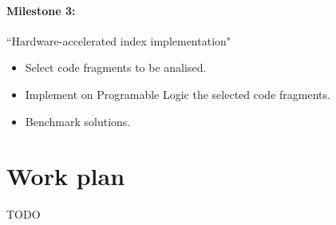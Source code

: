 \documentclass[11pt,letterpaper]{article}
\begin{document}
\paragraph{Milestone 3:} ``Hardware-accelerated index implementation"
\begin{itemize}
\item Select code fragments to be analised.
\item Implement on Programable Logic the selected code fragments.
\item Benchmark solutions.
\end{itemize}

\section{Work plan}

TODO






\end{document}
